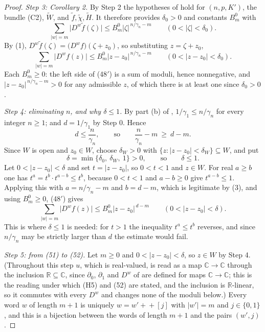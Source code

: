 \begin{proof}
\emph{Step 3: Corollary 2.}  By Step 2 the hypotheses of  hold
for $(n,p,K')$, the bundle (C2), $\widetilde W$, and
$\tilde f,\tilde\chi,\widetilde H$.  It therefore provides $\delta_0>0$ and
constants $B_m^{0}$ with
\begin{equation}\tag{48}
  \sum_{|w|=m}\bigl|D^{w}\tilde f(\zeta)\bigr|
  \le B^{0}_m|\zeta|^{\,n/\gamma_n-m}\qquad(0<|\zeta|<\delta_0).
\end{equation}
By (1), $D^{w}\tilde f(\zeta)=\bigl(D^{w}f\bigr)(\zeta+z_0)$, so substituting
$z=\zeta+z_0$,
\begin{equation}\tag{48$'$}
  \sum_{|w|=m}\bigl|D^{w}f(z)\bigr|
  \le B^{0}_m|z-z_0|^{\,n/\gamma_n-m}\qquad(0<|z-z_0|<\delta_0).
\end{equation}
Each $B^{0}_m\ge0$: the left side of (48$'$) is a sum of moduli, hence
nonnegative, and $|z-z_0|^{\,n/\gamma_n-m}>0$ for any admissible $z$, of which
there is at least one since $\delta_0>0$.

\emph{Step 4: eliminating $n$, and why $\delta\le1$.}  By part (b) of
, $1/\gamma_1\le n/\gamma_n$ for every integer
$n\ge1$; and $d=1/\gamma_1$ by Step 0.  Hence
\begin{equation}\tag{3}
  d\le\frac{n}{\gamma_n},\qquad\text{so}\qquad
  \frac{n}{\gamma_n}-m\ \ge\ d-m .
\end{equation}
Since $W$ is open and $z_0\in W$, choose $\delta_W>0$ with
$\{z:|z-z_0|<\delta_W\}\subseteq W$, and put
\[
  \delta=\min\{\delta_0,\ \delta_W,\ 1\}>0,\qquad\text{so}\qquad\delta\le1 .
\]
Let $0<|z-z_0|<\delta$ and set $t=|z-z_0|$, so $0<t<1$ and $z\in W$.  For real
$a\ge b$ one has $t^{a}=t^{b}\cdot t^{a-b}\le t^{b}$, because $0<t<1$ and
$a-b\ge0$ give $t^{a-b}\le1$.  Applying this with $a=n/\gamma_n-m$ and
$b=d-m$, which is legitimate by (3), and using $B^{0}_m\ge0$, (48$'$) gives
\begin{equation}\tag{51$'$}
  \sum_{|w|=m}\bigl|D^{w}f(z)\bigr|\le B^{0}_m|z-z_0|^{\,d-m}
  \qquad(0<|z-z_0|<\delta).
\end{equation}
This is where $\delta\le1$ is needed: for $t>1$ the inequality $t^{a}\le t^{b}$
reverses, and since $n/\gamma_n$ may be strictly larger than $d$ the estimate
would fail.

\emph{Step 5: from (51) to (52).}  Let $m\ge0$ and $0<|z-z_0|<\delta$, so
$z\in W$ by Step 4.  (Throughout this step $u$, which is real-valued, is read
as a map $\mathbb{C}\to\mathbb{C}$ through the inclusion
$\mathbb{R}\subseteq\mathbb{C}$, since $\partial_0$, $\partial_1$ and $D^{w}$
of  are defined for maps $\mathbb{C}\to\mathbb{C}$;
this is the reading under which (H5) and (52) are stated, and the inclusion is
$\mathbb{R}$-linear, so it commutes with every $D^{w}$ and changes none of the
moduli below.)  Every word $w$ of length $m+1$ is uniquely
$w=w'\!+\!\!+[j]$ with $|w'|=m$ and $j\in\{0,1\}$, and this is a bijection
between the words of length $m+1$ and the pairs $(w',j)$.


\end{proof}
